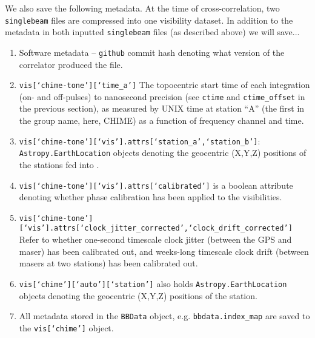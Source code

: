 We also save the following metadata. At the time of cross-correlation, two \texttt{singlebeam} files are compressed into one visibility dataset. In addition to the metadata in both inputted \texttt{singlebeam} files (as described above) we will save...
\begin{enumerate}
    \item  Software metadata -- \texttt{github} commit hash denoting what version of the correlator produced the file.
    \item \texttt{vis[`chime-tone'][`time\_a']} The topocentric start time of each integration (on- and off-pulses) to nanosecond precision (see \texttt{ctime} and \texttt{ctime\_offset} in the previous section), as measured by UNIX time at station ``A'' (the first in the group name, here, CHIME) as a function of frequency channel and time.
    \item \texttt{vis[`chime-tone'][`vis'].attrs[`station\_a',`station\_b']}: \texttt{Astropy.EarthLocation} objects denoting the geocentric (X,Y,Z) positions of the stations fed into \difxcalc.
    \item \texttt{vis[`chime-tone'][`vis'].attrs[`calibrated']} is a boolean attribute denoting whether phase calibration has been applied to the visibilities.
    \item \texttt{vis[`chime-tone'][`vis'].attrs[`clock\_jitter\_corrected',`clock\_drift\_corrected']} Refer to whether one-second timescale clock jitter (between the GPS and maser) has been calibrated out, and weeks-long timescale clock drift (between masers at two stations) has been calibrated out.
    \item \texttt{vis[`chime'][`auto'][`station']} also holds \texttt{Astropy.EarthLocation} objects denoting the geocentric (X,Y,Z) positions of the station.
    \item All metadata stored in the \texttt{BBData} object, e.g. \texttt{bbdata.index\_map} are saved to the \texttt{vis[`chime']} object.
\end{enumerate}